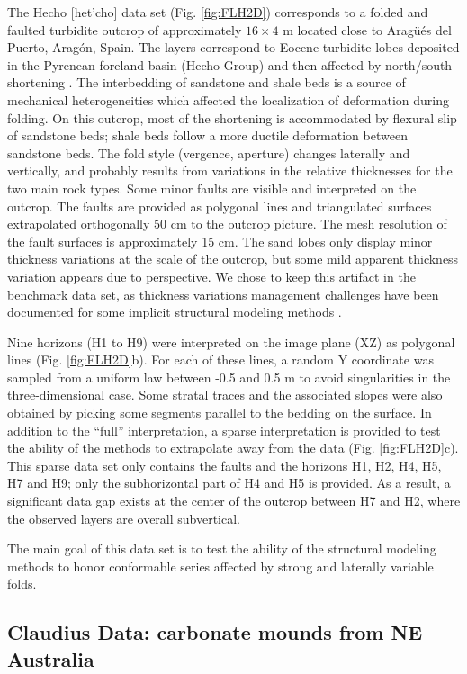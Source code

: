 \documentclass[final]{ring20}
\begin{document}
The Hecho [het'cho] data set (Fig. \ref{fig:FLH2D}) corresponds to a folded and faulted turbidite outcrop of approximately $16 \times 4$ m located close to Arag\"u\'es del Puerto, Arag\'on, Spain. The layers correspond to Eocene turbidite lobes deposited in the Pyrenean foreland basin (Hecho Group) and then affected by north/south shortening \citep{Bastida2012JSG}. The interbedding of sandstone and shale beds is a source of mechanical heterogeneities which affected the localization of deformation during folding. On this outcrop, most of the shortening is accommodated by flexural slip of sandstone beds; shale beds follow a more ductile deformation between sandstone beds. The fold style (vergence, aperture) changes laterally and vertically, and probably results from variations in the relative thicknesses for the two main rock types. Some minor faults are visible and interpreted on the outcrop. The faults are provided as polygonal lines and triangulated surfaces extrapolated orthogonally 50 cm to the outcrop picture. The mesh resolution of the fault surfaces is approximately 15 cm. The sand lobes only display minor thickness variations at the scale of the outcrop, but some mild apparent thickness variation appears due to perspective. We chose to keep this artifact in the benchmark data set, as thickness variations management challenges have been documented for some implicit structural modeling methods \citep{Laurent2016EaPSL}. 

Nine horizons (H1 to H9) were interpreted on the image plane (XZ) as polygonal lines (Fig. \ref{fig:FLH2D}b). For each of these lines, a random Y coordinate was sampled from a uniform law between -0.5 and 0.5 m to avoid singularities in the three-dimensional case. Some stratal traces and the associated slopes were also obtained by picking some segments parallel to the bedding on the surface. In addition to the ``full'' interpretation, a sparse interpretation is provided to test the ability of the methods to extrapolate away from the data (Fig. \ref{fig:FLH2D}c). This sparse data set only contains the faults and the horizons H1, H2, H4, H5, H7 and H9; only the subhorizontal part of H4 and H5 is provided. As a result, a significant data gap exists at the center of the outcrop between H7 and H2, where the observed layers are overall subvertical. 

The main goal of this data set is to test the ability of the structural modeling methods to honor conformable series affected by strong and laterally variable folds. 

\subsection{Claudius Data: carbonate mounds from NE Australia}
\end{document}
